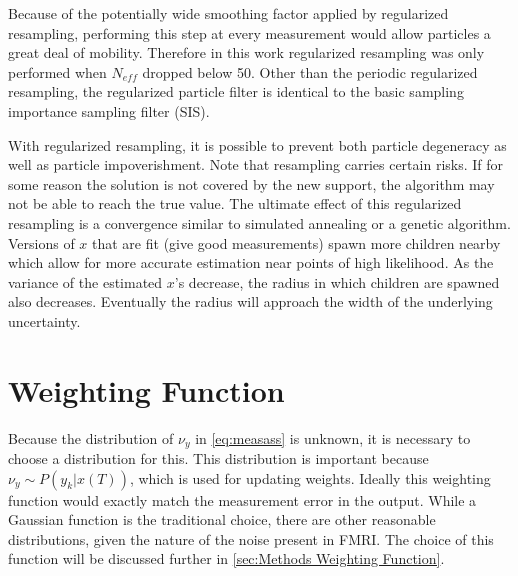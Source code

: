 Because 
of the potentially wide smoothing factor applied by regularized resampling, performing this
step at every measurement would allow particles a great deal of mobility. Therefore
in this work regularized resampling was only performed when $N_{eff}$ dropped
below 50. Other than the periodic regularized
resampling, the regularized particle filter is identical to the basic sampling
importance sampling filter (SIS). 

With regularized resampling, it is possible to prevent both
particle degeneracy as well as particle impoverishment. 
Note that resampling carries certain risks.  
If for some reason the solution is not covered by the 
new support, the algorithm may not be able to reach the true value. 
The ultimate effect of this regularized resampling is a convergence 
similar to simulated annealing or a genetic algorithm. 
Versions of $x$ that are fit (give good measurements) spawn more children 
nearby which allow for more accurate estimation near points of high likelihood. 
As the variance of the estimated $x$'s decrease, the radius in 
which children are spawned also decreases. Eventually the radius
will approach the width of the underlying uncertainty.

\section{Weighting Function}
Because the distribution of $\nu_y$ in \autoref{eq:measass} is unknown,
it is necessary to choose a distribution for this. This distribution
is important because $\nu_y \sim P(y_k | x(T))$, which is used
for updating weights. Ideally this weighting function would exactly 
match the measurement error in the output. 
While a Gaussian function is the traditional choice, there are other reasonable
distributions, given the nature of the noise present in FMRI.
The choice of this function will be discussed further in \autoref{sec:Methods Weighting Function}.

